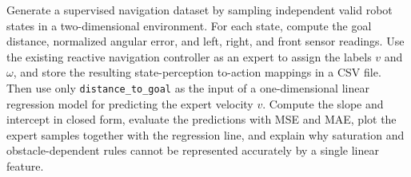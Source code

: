 \documentclass[10pt,twocolumn,a4paper]{article}
\begin{document}
Generate a supervised navigation dataset by sampling independent valid robot
states in a two-dimensional environment. For each state, compute the goal
distance, normalized angular error, and left, right, and front sensor
readings. Use the existing reactive navigation controller as an expert to
assign the labels $v$ and $\omega$, and store the resulting state-perception
to-action mappings in a CSV file. Then use only \texttt{distance\_to\_goal}
as the input of a one-dimensional linear regression model for predicting the
expert velocity $v$. Compute the slope and intercept in closed form, evaluate
the predictions with MSE and MAE, plot the expert samples together with the
regression line, and explain why saturation and obstacle-dependent rules
cannot be represented accurately by a single linear feature.

\end{document}
